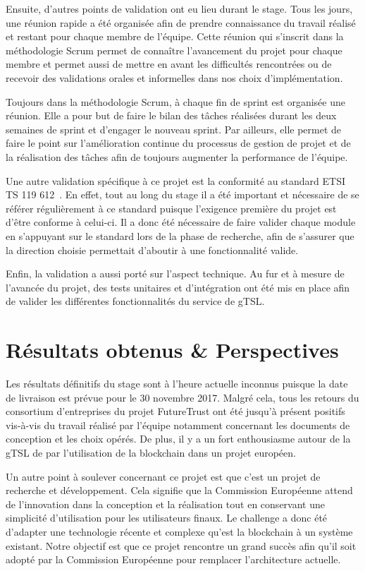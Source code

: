\documentclass{tnreport}
\begin{document}
Ensuite, d'autres points de validation ont eu lieu durant le stage. Tous les jours, une réunion rapide a été organisée afin de prendre connaissance du travail réalisé et restant pour chaque membre de l'équipe. Cette réunion qui s'inscrit dans la méthodologie Scrum permet de connaître l'avancement du projet pour chaque membre et permet aussi de mettre en avant les difficultés rencontrées ou de recevoir des validations orales et informelles dans nos choix d'implémentation. 

Toujours dans la méthodologie Scrum, à chaque fin de sprint est organisée une réunion. Elle a pour but de faire le bilan des tâches réalisées durant les deux semaines de sprint et d'engager le nouveau sprint. Par ailleurs, elle permet de faire le point sur l'amélioration continue du processus de gestion de projet et de la réalisation des tâches afin de toujours augmenter la performance de l'équipe. 

Une autre validation spécifique à ce projet est la conformité au standard ETSI TS 119 612~\cite{ETSITS119612}. En effet, tout au long du stage il a été important et nécessaire de se référer régulièrement à ce standard puisque l'exigence première du projet est d'être conforme à celui-ci. Il a donc été nécessaire de faire valider chaque module en s'appuyant sur le standard lors de la phase de recherche, afin de s'assurer que la direction choisie permettait d'aboutir à une fonctionnalité valide.

Enfin, la validation a aussi porté sur l'aspect technique. Au fur et à mesure de l'avancée du projet, des tests unitaires et d'intégration ont été mis en place afin de valider les différentes fonctionnalités du service de gTSL.

\chapter{Résultats obtenus \& Perspectives}

Les résultats définitifs du stage sont à l'heure actuelle inconnus puisque la date de livraison est prévue pour le 30 novembre 2017. Malgré cela, tous les retours du consortium d'entreprises du projet FutureTrust ont été jusqu'à présent positifs vis-à-vis du travail réalisé par l'équipe notamment concernant les documents de conception et les choix opérés. De plus, il y a un fort enthousiasme autour de la gTSL de par l'utilisation de la blockchain dans un projet européen.

Un autre point à soulever concernant ce projet est que c'est un projet de recherche et développement. Cela signifie que la Commission Européenne attend de l'innovation dans la conception et la réalisation tout en conservant une simplicité d'utilisation pour les utilisateurs finaux. Le challenge a donc été d'adapter une technologie récente et complexe qu'est la blockchain à un système existant. Notre objectif est que ce projet rencontre un grand succès afin qu'il soit adopté par la Commission Européenne pour remplacer l'architecture actuelle.
\end{document}
